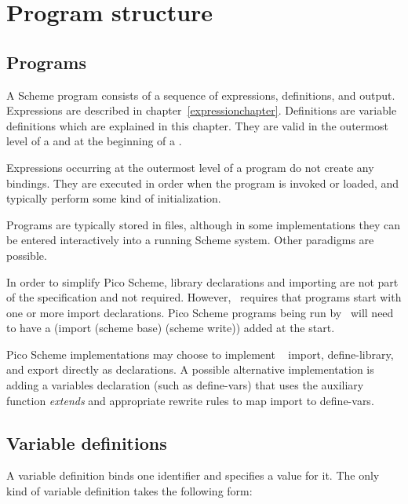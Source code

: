 \chapter{Program structure}
\label{programchapter}

\section{Programs}

A Scheme program consists of a sequence of
expressions, definitions, and output.
Expressions are described in chapter~\ref{expressionchapter}.
Definitions are variable definitions which are explained in this chapter.
They are valid in the outermost level of a 
and at the beginning of a .

Expressions occurring at the outermost level of a program
do not create any bindings.  They are
executed in order when the program is
invoked or loaded, and typically perform some kind of initialization.

Programs are typically stored in files, although
in some implementations they can be entered interactively into a running
Scheme system.  Other paradigms are possible.

\begin{note}
  In order to simplify Pico Scheme, library declarations and importing
  are not part of the specification and not required.  However,
  \rsevenrs\ requires that programs start with one or more import
  declarations. Pico Scheme programs being run by \rsevenrs\ will need
  to have a {\cf (import (scheme base) (scheme write))} added at the
  start.

  Pico Scheme implementations may choose to implement \rsevenrs\ {\cf
    import}, {\cf define-library}, and {\cf export} directly as
  declarations.  A possible alternative implementation is adding a
  variables declaration (such as {\cf define-vars}) that uses the
  auxiliary function {\it extends} and appropriate rewrite rules to
  map {\cf import} to {\cf define-vars}.
\end{note}

\section{Variable definitions}
\label{defines}

A variable definition binds one identifier and specifies a
value for it.
The only kind of variable definition
takes the following form:

